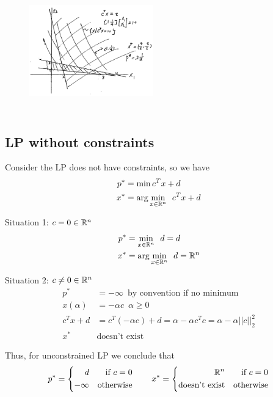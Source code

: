 \begin{figure}
	\centering
	\includegraphics[width=2.1in,height=2.1in]{figures/ch06/figure5.png}
\end{figure}



\subsection{LP without constraints}

Consider the LP does not have constraints, so we have
\begin{align*}
	p^* &= \min c^Tx+d\\
	x^* &= \arg \min_{x\in \mathbb{R}^n} \,\,\, c^Tx+d
\end{align*}

\vspace{0.5cm}
Situation 1: $c = 0 \in \mathbb{R}^n$
\begin{align*}
	p^* &= \min_{x\in \mathbb{R}^n} \,\,\, d=d\\
	x^* &= \arg \min_{x\in \mathbb{R}^n} \,\,\, d = \mathbb{R}^n
\end{align*}

Situation 2: $c \neq 0 \in \mathbb{R}^n$
\begin{align*}
	p^* &= -\infty\,\,\, \text{by convention if no minimum}\\
	x(\alpha) &= -\alpha c \,\,\, \alpha \geq 0\\
	c^Tx + d &= c^T(-\alpha c) + d = \alpha - \alpha c^Tc = \alpha - \alpha||c||^2_2\\
	x^* &\text{doesn't exist}
\end{align*}

Thus, for unconstrained LP we conclude that
$$
p^*=\left\{
\begin{aligned}
d &  & \text{if } c=0 \\
-\infty &  & \text{otherwise}
\end{aligned}
\right.
\qquad
x^*=\left\{
\begin{aligned}
\mathbb{R}^n & &\text{if } c=0 \\
\text{doesn't exist} &  & \text{otherwise}
\end{aligned}
\right.
$$

